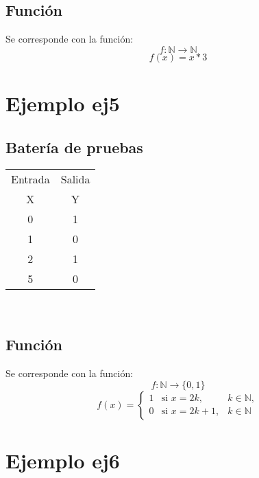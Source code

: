 \documentclass[a4paper]{article}
\begin{document}
  			\subsection{Función}
  				Se corresponde con la función:
  				$$f: \mathbb{N} \longrightarrow \mathbb{N}$$
  				\begin{equation*}
  					f(x) = x * 3
  				\end{equation*}

  		\section{Ejemplo ej5}
  			\subsection{Batería de pruebas}
  			\begin{center}
  				\begin{tabular}{|c|c|} \hline
  					\multicolumn{1}{|l|}{Entrada}&\multicolumn{1}{l|}{Salida}\\
  				X & Y \\
  					\hline
  				0 & 1 \\
  				1 & 0 \\
  				2 & 1 \\
  				5 & 0 \\
  					\hline
  				\end{tabular} \\
  			\end{center}
  			\subsection{Función}
  				Se corresponde con la función:
  				$$f: \mathbb{N} \longrightarrow \{0, 1\}$$
  				\begin{equation*}
  					f(x) = \left\{ 
  					\begin{array}{rcl}
  						1 & \text{si } x=2k, & k \in \mathbb{N}, \\
  						0 & \text{si } x=2k+1, & k \in \mathbb{N}
  					\end{array} \right.
  				\end{equation*}

  		\section{Ejemplo ej6}
\end{document}
